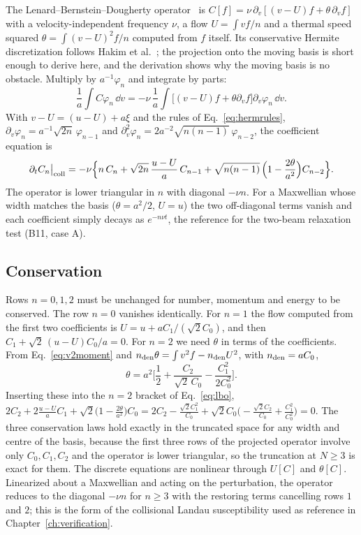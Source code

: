 The Lenard--Bernstein--Dougherty operator~\cite{Dougherty1964} is $C[f]=\nu\,\partial_v[(v-U)f+\theta\,\partial_vf]$ with a velocity-independent frequency $\nu$, a flow $U=\int vf/n$ and a thermal speed squared $\theta=\int(v-U)^2f/n$ computed from $f$ itself. Its conservative Hermite discretization follows Hakim et al.~\cite{Hakim2020}; the projection onto the moving basis is short enough to derive here, and the derivation shows why the moving basis is no obstacle. Multiply by $a^{-1}\varphi_n$ and integrate by parts:
\begin{equation}
\frac1a\!\int C\varphi_n\,\dd v=-\nu\,\frac1a\!\int\big[(v-U)f+\theta\partial_vf\big]\partial_v\varphi_n\,\dd v .
\end{equation}
With $v-U=(u-U)+a\xi$ and the rules of Eq.~\eqref{eq:hermrules}, $\partial_v\varphi_n=a^{-1}\sqrt{2n}\,\varphi_{n-1}$ and $\partial_v^2\varphi_n=2a^{-2}\sqrt{n(n-1)}\,\varphi_{n-2}$, the coefficient equation is
\begin{equation}
\partial_tC_n\big|_{\rm coll}=-\nu\Big\{n\,C_n+\sqrt{2n}\,\frac{u-U}{a}\,C_{n-1}+\sqrt{n(n-1)}\,\Big(1-\frac{2\theta}{a^2}\Big)C_{n-2}\Big\}.
\label{eq:lbo}
\end{equation}
The operator is lower triangular in $n$ with diagonal $-\nu n$. For a Maxwellian whose width matches the basis ($\theta=a^2/2$, $U=u$) the two off-diagonal terms vanish and each coefficient simply decays as $e^{-n\nu t}$, the reference for the two-beam relaxation test (B11, case A).

\subsection{Conservation}

Rows $n=0,1,2$ must be unchanged for number, momentum and energy to be conserved. The row $n=0$ vanishes identically. For $n=1$ the flow computed from the first two coefficients is $U=u+aC_1/(\sqrt2C_0)$, and then $C_1+\sqrt2\,(u-U)C_0/a=0$. For $n=2$ we need $\theta$ in terms of the coefficients. From Eq.~\eqref{eq:v2moment} and $n_{\rm den}\theta=\int v^2f-n_{\rm den}U^2$, with $n_{\rm den}=aC_0$,
\begin{equation}
\theta=a^2\Big[\frac12+\frac{C_2}{\sqrt2\,C_0}-\frac{C_1^2}{2C_0^2}\Big].
\end{equation}
Inserting these into the $n=2$ bracket of Eq.~\eqref{eq:lbo}, $2C_2+2\frac{u-U}{a}C_1+\sqrt2\big(1-\frac{2\theta}{a^2}\big)C_0=2C_2-\frac{\sqrt2C_1^2}{C_0}+\sqrt2C_0\big(-\frac{\sqrt2C_2}{C_0}+\frac{C_1^2}{C_0^2}\big)=0$. The three conservation laws hold exactly in the truncated space for any width and centre of the basis, because the first three rows of the projected operator involve only $C_0,C_1,C_2$ and the operator is lower triangular, so the truncation at $N\ge3$ is exact for them. The discrete equations are nonlinear through $U[C]$ and $\theta[C]$. Linearized about a Maxwellian and acting on the perturbation, the operator reduces to the diagonal $-\nu n$ for $n\ge3$ with the restoring terms cancelling rows $1$ and $2$; this is the form of the collisional Landau susceptibility used as reference in Chapter~\ref{ch:verification}.

